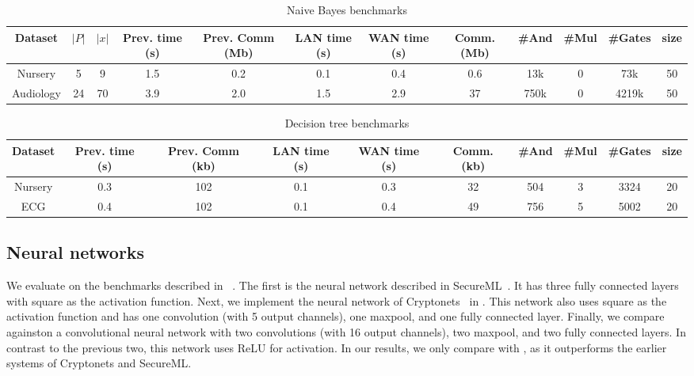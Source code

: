 \begin{table*}
\begin{tabular}{c|c|c|c|c|c |c|c|c|c|c|c}
Dataset & $|P|$ & $|x|$ & Prev. time (s) & Prev. Comm (Mb) & LAN time (s) & WAN time (s) & Comm. (Mb)  & \#And & \#Mul & \#Gates  & size\\
\hline
Nursery & 5 & 9 & 1.5 & 0.2 & 0.1 & 0.4 & 0.6 & 13k & 0 & 73k & 50\\
\hline
Audiology & 24 & 70 & 3.9 & 2.0 & 1.5 & 2.9 & 37 & 750k & 0 & 4219k & 50\\
\hline
\end{tabular}

 \caption{Naive Bayes benchmarks}
 \label{tab:nb} 
\end{table*}

\begin{table*}
\begin{tabular}{c|c|c|c |c|c|c|c|c|c}
Dataset  & Prev. time (s) & Prev. Comm (kb) & LAN time (s) & WAN time (s) & Comm. (kb)  & \#And & \#Mul & \#Gates & size\\
\hline
Nursery &  0.3 & 102 & 0.1 & 0.3 & 32 & 504 & 3 & 3324 & 20\\
\hline
ECG &  0.4 & 102 & 0.1 & 0.4 & 49 & 756 & 5 & 5002 & 20\\
\hline
\end{tabular}

 \caption{Decision tree benchmarks}
 \label{tab:dt} 
\end{table*}



\subsection{Neural networks}
We evaluate on the benchmarks described in \minion~\cite{minionn}.
The first is the neural network described in SecureML~\cite{secureml}.
It has three fully connected layers with square as the activation function.
Next, we implement the neural network of Cryptonets~\cite{cryptonets} in \tool.
This network also uses square as the activation function and has one convolution (with 5 output channels), one maxpool, and one fully connected layer.
Finally, we compare against\minion on a convolutional neural network
with two convolutions (with 16 output channels), two maxpool, and two fully connected layers.
In contrast to the previous two, this network uses ReLU for activation.
In our results, we only compare with \minion, as it outperforms the earlier systems of
Cryptonets and SecureML.


